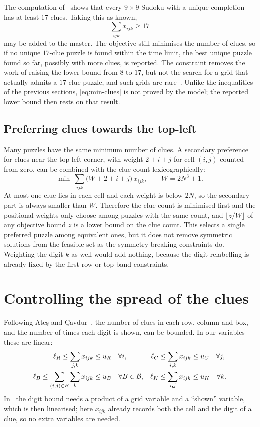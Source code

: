 \documentclass[11pt]{article}
\newcommand{\clue}{x}
\begin{document}
The computation of~\cite{mcguire} shows that every $9\times9$ Sudoku with a unique completion has at least $17$ clues. Taking this as known,
\begin{equation}
\sum_{ijk}\clue_{ijk}\ge 17
\label{eq:min-clues}
\end{equation}
may be added to the master. The objective still minimises the number of clues, so if no unique $17$-clue puzzle is found within the time limit, the best unique puzzle found so far, possibly with more clues, is reported. The constraint removes the work of raising the lower bound from $8$ to $17$, but not the search for a grid that actually admits a $17$-clue puzzle, and such grids are rare~\cite{mcguire}. Unlike the inequalities of the previous sections, \eqref{eq:min-clues} is not proved by the model; the reported lower bound then rests on that result.

\subsection{Preferring clues towards the top-left}

Many puzzles have the same minimum number of clues. A secondary preference for clues near the top-left corner, with weight $2+i+j$ for cell $(i,j)$ counted from zero, can be combined with the clue count lexicographically:
\begin{equation}
\min\ \sum_{ijk}\bigl(W+2+i+j\bigr)\,\clue_{ijk},
\qquad W=2N^3+1.
\label{eq:position-weights}
\end{equation}
At most one clue lies in each cell and each weight is below $2N$, so the secondary part is always smaller than $W$. Therefore the clue count is minimised first and the positional weights only choose among puzzles with the same count, and $\lfloor z/W\rfloor$ of any objective bound $z$ is a lower bound on the clue count. This selects a single preferred puzzle among equivalent ones, but it does not remove symmetric solutions from the feasible set as the symmetry-breaking constraints do. Weighting the digit $k$ as well would add nothing, because the digit relabelling is already fixed by the first-row or top-band constraints.

\section{Controlling the spread of the clues}
\label{sec:spread}

Following Ate\c{s} and \c{C}avdur~\cite{ates}, the number of clues in each row, column and box, and the number of times each digit is shown, can be bounded. In our variables these are linear:
\begin{align}
\ell_R\le\sum_{j,k}\clue_{ijk}&\le u_R\quad\forall i, &
\ell_C\le\sum_{i,k}\clue_{ijk}&\le u_C\quad\forall j, \label{eq:spread}\\
\ell_B\le\sum_{(i,j)\in B}\sum_k\clue_{ijk}&\le u_B\quad\forall B\in\mathcal B, &
\ell_K\le\sum_{i,j}\clue_{ijk}&\le u_K\quad\forall k. \notag
\end{align}
In~\cite{ates} the digit bound needs a product of a grid variable and a ``shown'' variable, which is then linearised; here $\clue_{ijk}$ already records both the cell and the digit of a clue, so no extra variables are needed.
\end{document}
